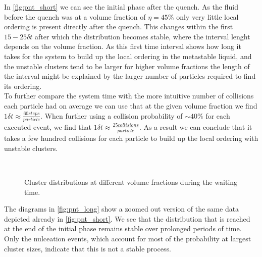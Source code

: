 In \autoref{fig:pnt_short} we can see the initial phase after the quench. As the fluid before the quench was at a volume fraction of $\eta=45\%$ only very little local ordering is present directly after the quench. This changes within the first $15 -25 \delta t$ after which the distribution becomes stable, where the interval lenght depends on the volume fraction. As this first time interval shows how long it takes for the system to build up the local ordering in the metastable liquid, and the unstable clusters tend to be larger for higher volume fractions the length of the interval might be explained by the larger number of particles required to find its ordering.\\ 
To further compare the system time with the more intuitive number of collisions each particle had on average we can use that at the given volume fraction we find  $1\delta t \approx \frac{60 steps}{particle}$. When further using a collision probability of $\sim 40 \%$ for each executed event, we find that $1\delta t \approx \frac{25 collisions}{particle}$. As a result we can conclude that it takes a few hundred collisions for each particle to build up the local ordering with unstable clusters.\\

\begin{figure}[ht]
\begin{center}
 \hspace{0.0cm}
\\
 \hspace{0.0cm}
\caption[Cluster size distributions for long waiting times]{Cluster distributions at different volume fractions during the waiting time.}
\label{fig:pnt_long}
\end{center}
\end{figure}

The diagrams in \autoref{fig:pnt_long} show a zoomed out version of the same data depicted already in \autoref{fig:pnt_short}. We see that the distribution that is reached at the end of the initial phase remains stable over prolonged periods of time. Only the nulceation events, which account for most of the probability at largest cluster sizes, indicate that this is not a stable process.

